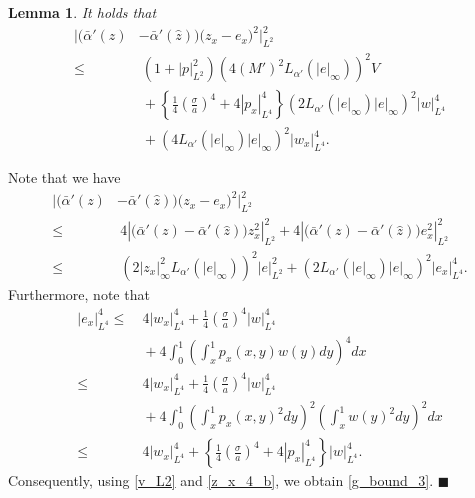 \documentclass[twocolumn]{autart}
\newtheorem{lemm}{Lemma}
\newenvironment{lemma}{\begin{lemm}}{\hfill \end{lemm}}
\newenvironment{proof}{{\it Proof. }}{\hfill $\blacksquare$ }
\begin{document}
\begin{lemma}
It holds that
\begin{align}
|\big( \bar{\alpha}'(z)&-\bar{\alpha}'(\hat{z})\big)\big(z_x-e_x\big)^2|_{L^2}^2 \nonumber \\
\leq&~\left(1+|p|_{L^2}^2\right)\left(4(M')^2L_{\alpha'}(|e|_{\infty})\right)^2V \nonumber \\
&~+\left\{\frac{1}{4}\left(\frac{\sigma}{a}\right)^4+4|p_x|_{L^4}^4\right\}\left(2L_{\alpha'}(|e|_{\infty})|e|_{\infty}\right)^2|w|_{L^4}^4 \nonumber \\
&~+\left(4L_{\alpha'}(|e|_{\infty})|e|_{\infty}\right)^2|w_x|_{L^4}^4. \label{g_bound_3}
\end{align}
\hfill  
\end{lemma}
\begin{proof}
Note that we have 
\begin{align*}
|\big( \bar{\alpha}'(z)&-\bar{\alpha}'(\hat{z})\big)\big(z_x-e_x\big)^2|_{L^2}^2 \\
\leq&~4|\big( \bar{\alpha}'(z)-\bar{\alpha}'(\hat{z})\big)z_x^2|_{L^2}^2+4|\big( \bar{\alpha}'(z)-\bar{\alpha}'(\hat{z})\big)e_x^2|_{L^2}^2 \\
\leq&~\left(2|z_x|_{\infty}^2L_{\alpha'}(|e|_{\infty})\right)^2|e|_{L^2}^2 +\left(2L_{\alpha'}(|e|_{\infty})|e|_{\infty}\right)^2|e_x|_{L^4}^4. 
\end{align*}
Furthermore, note that 
\begin{align}
|e_x|_{L^4}^4 \leq&~ 4|w_x|_{L^4}^4+\frac{1}{4}\left(\frac{\sigma}{a}\right)^4|w|_{L^4}^4  \nonumber \\
&~+ 4\int_{0}^{1}\left(\int_{x}^{1}p_x(x,y)w(y)dy\right)^4dx \nonumber \\
\leq&~ 4|w_x|_{L^4}^4+\frac{1}{4}\left(\frac{\sigma}{a}\right)^4|w|_{L^4}^4  \nonumber \\
&~+ 4\int_{0}^{1}\left(\int_{x}^{1}p_x(x,y)^2dy\right)^2\left(\int_{x}^{1}w(y)^2dy\right)^2dx \nonumber \\
\leq&~4|w_x|_{L^4}^4+\left\{\frac{1}{4}\left(\frac{\sigma}{a}\right)^4+4|p_x|_{L^4}^4\right\}|w|_{L^4}^4.\label{z_x_4_b}
\end{align}
Consequently, using \eqref{v_L2} and \eqref{z_x_4_b}, we obtain \eqref{g_bound_3}. 
\end{proof}
\end{document}
